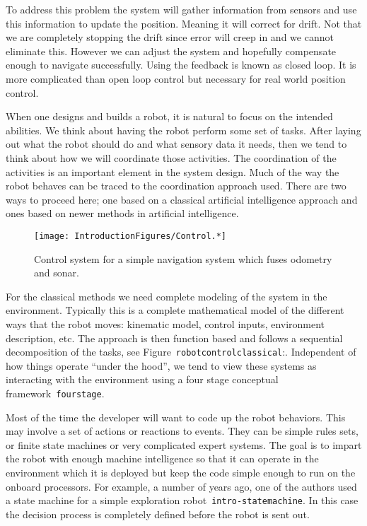 To address this problem the system will gather information from sensors
and use this information to update the position. Meaning it will correct
for drift. Not that we are completely stopping the drift since error
will creep in and we cannot eliminate this. However we can adjust the
system and hopefully compensate enough to navigate successfully. Using
the feedback is known as closed loop. It is more complicated than open
loop control but necessary for real world position control.

When one designs and builds a robot, it is natural to focus on the
intended abilities. We think about having the robot perform some set of
tasks. After laying out what the robot should do and what sensory data
it needs, then we tend to think about how we will coordinate those
activities. The coordination of the activities is an important element
in the system design. Much of the way the robot behaves can be traced to
the coordination approach used. There are two ways to proceed here; one
based on a classical artificial intelligence approach and ones based on
newer methods in artificial intelligence.

\begin{figure}
\centering
\texttt{[image: IntroductionFigures/Control.*]}
\caption{Control system for a simple navigation system which fuses
odometry and sonar.}
\end{figure}

For the classical methods we need complete modeling of the system in the
environment. Typically this is a complete mathematical model of the
different ways that the robot moves: kinematic model, control inputs,
environment description, etc. The approach is then function based and
follows a sequential decomposition of the tasks, see
Figure~\texttt{robotcontrolclassical}:. Independent of how things
operate ``under the hood'', we tend to view these systems as interacting
with the environment using a four stage conceptual
framework~\texttt{fourstage}.

Most of the time the developer will want to code up the robot behaviors.
This may involve a set of actions or reactions to events. They can be
simple rules sets, or finite state machines or very complicated expert
systems. The goal is to impart the robot with enough machine
intelligence so that it can operate in the environment which it is
deployed but keep the code simple enough to run on the onboard
processors. For example, a number of years ago, one of the authors used
a state machine for a simple exploration
robot~\texttt{intro-statemachine}. In this case the decision process is
completely defined before the robot is sent out.

